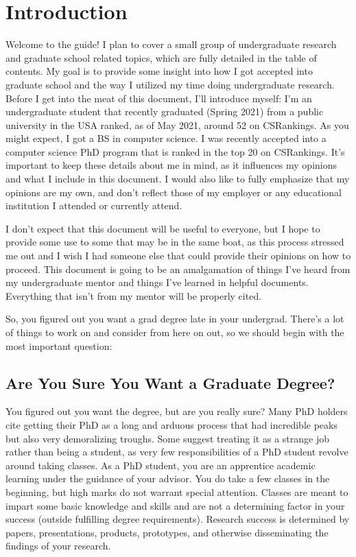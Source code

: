 \documentclass[12pt]{article}
\begin{document}


\tableofcontents
\pagebreak

\section{Introduction}

Welcome to the guide! I plan to cover a small group of undergraduate research and graduate school related topics, which are fully detailed in the table of contents. My goal is to provide some insight into how I got accepted into graduate school and the way I utilized my time doing undergraduate research. Before I get into the meat of this document, I’ll introduce myself: I’m an undergraduate student that recently graduated (Spring 2021) from a public university in the USA ranked, as of May 2021, around 52 on CSRankings. As you might expect, I got a BS in computer science. I was recently accepted into a computer science PhD program that is ranked in the top 20 on CSRankings. It’s important to keep these details about me in mind, as it influences my opinions and what I include in this document. I would also like to fully emphasize that my opinions are my own, and don’t reflect those of my employer or any educational institution I attended or currently attend. 

I don’t expect that this document will be useful to everyone, but I hope to provide some use to some that may be in the same boat, as this process stressed me out and I wish I had someone else that could provide their opinions on how to proceed. This document is going to be an amalgamation of things I've heard from my undergraduate mentor and things I've learned in helpful documents. Everything that isn't from my mentor will be properly cited.

So, you figured out you want a grad degree late in your undergrad. There’s a lot of things to work on and consider from here on out, so we should begin with the most important question:

\subsection{Are You Sure You Want a Graduate Degree?}

You figured out you want the degree, but are you really sure? Many PhD holders cite getting their PhD as a long and arduous process that had incredible peaks but also very demoralizing troughs. Some suggest treating it as a strange job rather than being a student, as very few responsibilities of a PhD student revolve around taking classes. \cite{AzumaPhD} As a PhD student, you are an apprentice academic learning under the guidance of your advisor. You do take a few classes in the beginning, but high marks do not warrant special attention. Classes are meant to impart some basic knowledge and skills and are not a determining factor in your success (outside fulfilling degree requirements). Research success is determined by papers, presentations, products, prototypes, and otherwise disseminating the findings of your research.
\end{document}
